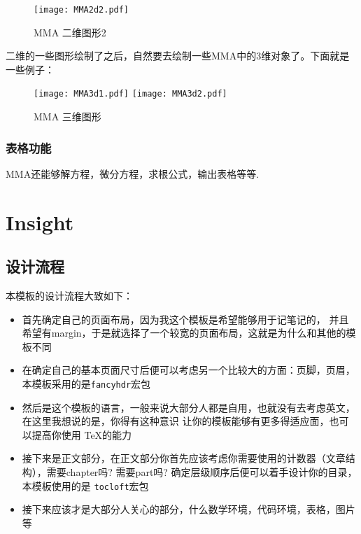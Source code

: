 \documentclass[lang=cn, math=mathptmx]{ZLaTeX}
\begin{document}
\begin{figure}[!htb]
    \centering
    \texttt{[image: MMA2d2.pdf]}
    \caption{MMA 二维图形2}
    \label{MMA 二维图形2}
\end{figure}

二维的一些图形绘制了之后，自然要去绘制一些MMA中的3维对象了。下面就是
一些例子：

\begin{figure}[!htb]
    \centering
    \texttt{[image: MMA3d1.pdf]}
    \texttt{[image: MMA3d2.pdf]}
    \caption{MMA 三维图形}
    \label{MMA 三维图形}
\end{figure}


\subsection{表格功能}
MMA还能够解方程，微分方程，求根公式，输出表格等等.




\chapter{\zlatex{} Insight}
\section{设计流程}
本模板的设计流程大致如下：
\begin{itemize}
    \item 首先确定自己的页面布局，因为我这个模板是希望能够用于记笔记的，
        并且希望有margin，于是就选择了一个较宽的页面布局，这就是为什么和其他的模板不同
    \item 在确定自己的基本页面尺寸后便可以考虑另一个比较大的方面：页脚，页眉，本模板采用的是\verb|fancyhdr|宏包
    \item 然后是这个模板的语言，一般来说大部分人都是自用，也就没有去考虑英文，在这里我想说的是，你得有这种意识
        让你的模板能够有更多得适应面，也可以提高你使用 \TeX{}的能力
    \item 接下来是正文部分，在正文部分你首先应该考虑你需要使用的计数器（文章结构），需要chapter吗? 需要part吗?
        确定层级顺序后便可以着手设计你的目录，本模板使用的是 \verb|tocloft|宏包
    \item 接下来应该才是大部分人关心的部分，什么数学环境，代码环境，表格，图片等
\end{itemize}
\end{document}
